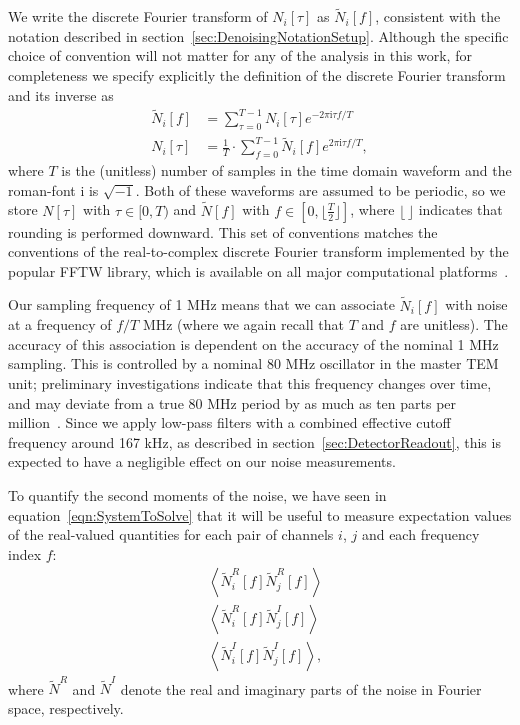 We write the discrete Fourier transform of $N_i[\tau]$ as $\widetilde{N}_i[f]$, consistent with the notation described in section~\ref{sec:DenoisingNotationSetup}.  Although the specific choice of convention will not matter for any of the analysis in this work, for completeness we specify explicitly the definition of the discrete Fourier transform and its inverse as
\begin{align}
\widetilde{N}_i[f] &= \sum_{\tau = 0}^{T-1} N_i[\tau] e^{-2\pi \mathrm{i} \tau f/T}\label{eqn:NoiseChapterDefnFourierTransform}\\
N_i[\tau] &= \frac{1}{T}\cdot \sum_{f = 0}^{T-1} \widetilde{N}_i[f] e^{2\pi \mathrm{i} \tau f/T},
\end{align}
where $T$ is the (unitless) number of samples in the time domain waveform and the roman-font $\mathrm{i}$ is $\sqrt{-1}$.  Both of these waveforms are assumed to be periodic, so we store $N[\tau]$ with $\tau \in [0, T)$ and $\widetilde{N}[f]$ with $f \in \left[0, \lfloor \frac{T}{2} \rfloor\right]$, where $\lfloor\,\rfloor$ indicates that rounding is performed downward.  This set of conventions matches the conventions of the real-to-complex discrete Fourier transform implemented by the popular FFTW library, which is available on all major computational platforms~\cite{FFTW05}.

Our sampling frequency of 1 MHz means that we can associate $\widetilde{N}_i[f]$ with noise at a frequency of $f/T$ MHz (where we again recall that $T$ and $f$ are unitless).  The accuracy of this association is dependent on the accuracy of the nominal 1 MHz sampling.  This is controlled by a nominal 80 MHz oscillator in the master TEM unit; preliminary investigations indicate that this frequency changes over time, and may deviate from a true 80 MHz period by as much as ten parts per million~\cite{DAQWeirdDetails,EXOElectronicsFunctionalSpecification}.  Since we apply low-pass filters with a combined effective cutoff frequency around 167 kHz, as described in section~\ref{sec:DetectorReadout}, this is expected to have a negligible effect on our noise measurements.

To quantify the second moments of the noise, we have seen in equation~\ref{eqn:SystemToSolve} that it will be useful to measure expectation values of the real-valued quantities for each pair of channels $i$, $j$ and each frequency index $f$:
\begin{subequations}\label{eq:NoiseChapterAllExpValues}\begin{align}
&\left<\widetilde{N}^R_i[f]\widetilde{N}^R_j[f]\right>\label{eq:NoiseChapterFirstExpValue}\\
&\left<\widetilde{N}^R_i[f]\widetilde{N}^I_j[f]\right>\label{eq:NoiseChapterSecondExpValue}\\
&\left<\widetilde{N}^I_i[f]\widetilde{N}^I_j[f]\right>\label{eq:NoiseChapterThirdExpValue},
\end{align}\end{subequations}
where $\widetilde{N}^R$ and $\widetilde{N}^I$ denote the real and imaginary parts of the noise in Fourier space, respectively.

